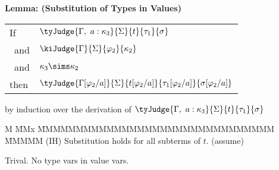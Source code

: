 
\clearpage{}
\begin{flushleft}
\textbf{Lemma: (Substitution of Types in Values)}

\begin{tabular}{ll}
 	If  	& $\tyJudge{\Gamma, \ a : \kappa_3}{\Sigma}{t}{\tau_1}{\sigma}$ 
	\\
 	\ and  	& $\kiJudge{\Gamma}{\Sigma}{\varphi_2}{\kappa_2}$ 
	\\
	\ and	& $\kappa_3 \sims \kappa_2$ 
	\\[1ex]
	then	& $\tyJudge{\Gamma[\varphi_2/a]}{\Sigma}
				{t[\varphi_2/a]}{\tau_1[\varphi_2/a]}{\sigma[\varphi_2/a]}$ \\
\end{tabular}

\medskip
{} by induction over the derivation of $\tyJudge{\Gamma, \ a : \kappa_3}{\Sigma}{t}{\tau_1}{\sigma}$

\medskip
\begin{tabbing}
M \= MMx \= MMMMMMMMMMMMMMMMMMMMMMMMMMMMMMM \= MMMMM  \kill
\>	 (IH) 
	\> Substitution holds for all subterms of $t$.
	\> (assume) 
\end{tabbing}


Trival. No type vars in value vars.



\end{flushleft}
